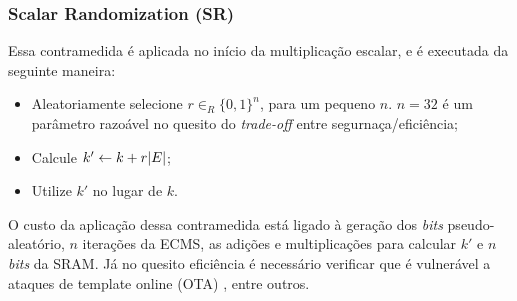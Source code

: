 \subsubsection{Scalar Randomization (SR)}
Essa contramedida é aplicada no início da multiplicação escalar, e é executada da seguinte maneira:
\begin{itemize}
    \item Aleatoriamente selecione $r\in_R \{0,1\}^n$, para um pequeno $n$. $n=32$ é um parâmetro razoável no quesito do \textit{trade-off} entre segurnaça/eficiência;
    \item Calcule $k' \leftarrow k + r |E|$;
    \item Utilize $k'$ no lugar de $k$.
\end{itemize}

O custo da aplicação dessa contramedida está ligado à geração dos \textit{bits} pseudo-aleatório, $n$ iterações da ECMS, as adições e multiplicações para calcular $k'$ e $n$ \textit{bits} da SRAM. Já no quesito eficiência é necessário verificar que é vulnerável a ataques de template online (OTA) \cite{BatinaChmielewski2014}, entre outros. 

